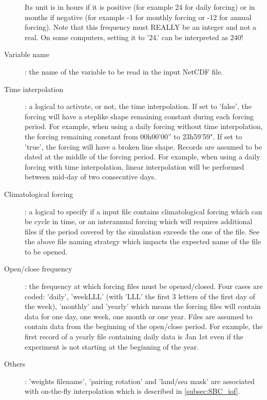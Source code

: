 \documentclass[../main/NEMO_manual]{subfiles}
\begin{document}
\begin{description}
  Its unit is in hours if it is positive (for example 24 for daily forcing) or in months if negative
  (for example -1 for monthly forcing or -12 for annual forcing).
  Note that this frequency must REALLY be an integer and not a real.
  On some computers, setting it to '24.' can be interpreted as 240!
\item [Variable name]: the name of the variable to be read in the input NetCDF file.
\item [Time interpolation]: a logical to activate, or not, the time interpolation.
  If set to 'false', the forcing will have a steplike shape remaining constant during each forcing period.
  For example, when using a daily forcing without time interpolation, the forcing remaining constant from
  00h00'00'' to 23h59'59".
  If set to 'true', the forcing will have a broken line shape.
  Records are assumed to be dated at the middle of the forcing period.
  For example, when using a daily forcing with time interpolation,
  linear interpolation will be performed between mid-day of two consecutive days.
\item [Climatological forcing]: a logical to specify if a input file contains climatological forcing which can be cycle in time,
  or an interannual forcing which will requires additional files if
  the period covered by the simulation exceeds the one of the file.
  See the above file naming strategy which impacts the expected name of the file to be opened.
\item [Open/close frequency]: the frequency at which forcing files must be opened/closed.
  Four cases are coded:
  'daily', 'weekLLL' (with 'LLL' the first 3 letters of the first day of the week), 'monthly' and 'yearly' which
  means the forcing files will contain data for one day, one week, one month or one year.
  Files are assumed to contain data from the beginning of the open/close period.
  For example, the first record of a yearly file containing daily data is Jan 1st even if
  the experiment is not starting at the beginning of the year.
\item [Others]:  'weights filename', 'pairing rotation' and 'land/sea mask' are associated with
  on-the-fly interpolation which is described in \autoref{subsec:SBC_iof}.
\end{description}
\end{document}
